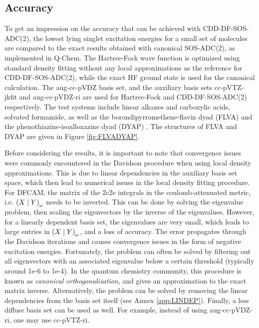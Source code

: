 \subsection{Accuracy}

To get an impression on the accuracy that can be achieved with CDD-DF-SOS-ADC(2), the lowest lying singlet excitation energies for a small set of molecules are compared to the exact results obtained with canonical SOS-ADC(2), as implemented in Q-Chem. The Hartree-Fock wave function is optimized using standard density fitting without any local approximations as the reference for CDD-DF-SOS-ADC(2), while the exact HF ground state is used for the canonical calculation. The aug-cc-pVDZ basis set, and the auxiliary basis sets cc-pVTZ-jkfit and aug-cc-pVDZ-ri are used for Hartree-Fock and CDD-DF-SOS-ADC(2) respectively. The test systems include linear alkanes and carboxylic acids, solvated formamide, as well as the borondipyrromethene-flavin dyad (FLVA) \cite{Kat2007} and the phenothiazine-isoalloxazine dyad (DYAP) \cite{Cra2002}. The structures of FLVA and DYAP are given in Figure \ref{fig:FLVADYAP}.


Before considering the results, it is important to note that convergence issues were commonly encountered in the Davidson procedure when using local density approximations. This is due to linear dependencies in the auxiliary basis set space, which then lead to numerical issues in the local density fitting procedure. For DFCAM, the matrix of the 2c2e integrals in the coulomb-attenuated metric, i.e. $\left( X \mid Y \right)_{\omega}$ needs to be inverted. This can be done by solving the eigenvalue problem, then scaling the eigenvectors by the inverse of the eigenvalues. However, for a linearly dependent basis set, the eigenvalues are very small, which leads to large entries in $\left( X \mid Y \right)_{\omega}$, and a loss of accuracy. The error propagates through the Davidson iterations and causes convergence issues in the form of negative excitation energies. Fortunately, the problem can often be solved by filtering out all eigenvectors with an associated eigenvalue below a certain threshold (typically around 1e-6 to 1e-4). In the quantum chemistry community, this procedure is known as \emph{canonical orthogonalization}, and gives an approximation to the exact matrix inverse. Alternatively, the problem can be solved by removing the linear dependencies from the basis set itself (see Annex \ref{app:LINDEP}). Finally, a less diffuse basis set can be used as well. For example, instead of using aug-cc-pVDZ-ri, one may use cc-pVTZ-ri.

